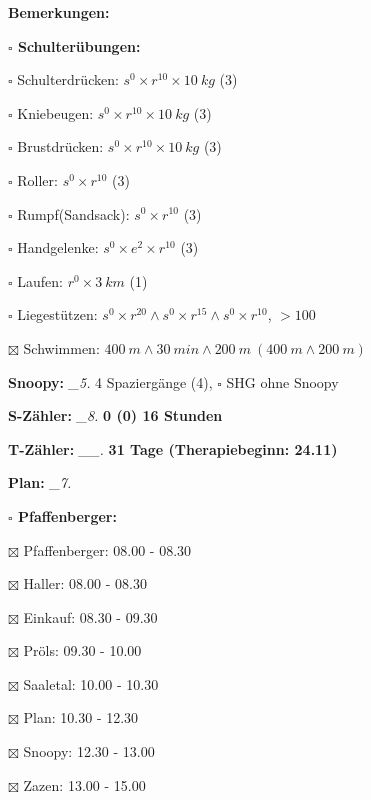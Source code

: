 \documentclass[10pt,a4paper]{article}
\newcommand\prop[1] {{\color {alizarin} {\bf #1}}}             %
\newcommand\rewo[1] {{\color {aqua} {\bf #1}}}                 %
\newcommand\down[1] {{\color {lime(web)(x11green)} {\bf #1}}}  %
\newcommand\mand[1] {{\color {burntorange} {\bf #1}}}          %
\newcommand\topspace{\vskip -15pt \hskip 20pt}
\newcommand\bottomspace{\vskip 4pt}
\newcommand\n[1] { {\sl #1.} \hskip 5pt }
\begin{document}
\begin{mdframed}[style=daystyle]
\begin{labeling}{{\mand {Bemerkungen:}}}
\begin{minipage}{0.75\textwidth}
\begin{labeling}{\prop {$\square$ {Schulterübungen:}}}
      \item[$\square$ Schulterdrücken:] $s^0 \times r^{10} \times 10\ kg$ (3)
      \item[$\square$ Kniebeugen:]      $s^0 \times r^{10} \times 10\ kg$ (3)
      \item[$\square$ Brustdrücken:]    $s^0 \times r^{10} \times 10\ kg$ (3)
      \item[$\square$ Roller:]          $s^0 \times r^{10}$ (3)
      \item[$\square$ Rumpf(Sandsack):] $s^0 \times r^{10}$ (3)
      \item[$\square$ Handgelenke:]     $s^0 \times e^2 \times r^{10}$ (3)
      \item[$\square$ Laufen:]          $r^0 \times 3\ km$ (1)
      \item[$\square$ Liegestützen:]    $s^0 \times r^{20} \land s^0 \times r^{15} \land s^0 \times r^{10}$, $> 100$
      \item[$\boxtimes$ Schwimmen:]       $400\ m \land 30\ min \land 200\ m\ (400\ m \land 200\ m)$
      \end{labeling}
    \end{minipage}
    \bottomspace        
  \item[{\mand {Snoopy:}}]        \n{\_5} 4 Spaziergänge (4), $\square$ SHG ohne Snoopy
  \item[{\mand {S-Zähler:}}]      \n{\_8} {\rewo {0 (0) 16 Stunden}}
  \item[{\mand {T-Zähler:}}]     \n{\_\_} {\down {31 Tage (Therapiebeginn: 24.11)}}
  \item[{\mand {Plan:}}]          \n{\_7}
    \topspace
    \begin{minipage}{0.75\textwidth}  
      \begin{labeling}{\prop {$\square$ {Pfaffenberger:}}} 
        \setlength\itemsep{-3pt}
      \item[$\boxtimes$ Pfaffenberger:] 08.00 - 08.30
      \item[$\boxtimes$ Haller:]        08.00 - 08.30
      \item[$\boxtimes$ Einkauf:]       08.30 - 09.30
      \item[$\boxtimes$ Pröls:]         09.30 - 10.00
      \item[$\boxtimes$ Saaletal:]      10.00 - 10.30
      \item[$\boxtimes$ Plan:]          10.30 - 12.30
      \item[$\boxtimes$ Snoopy:]        12.30 - 13.00
      \item[$\boxtimes$ Zazen:]         13.00 - 15.00

\end{labeling}
\end{minipage}
\end{labeling}
\end{mdframed}
\end{document}
